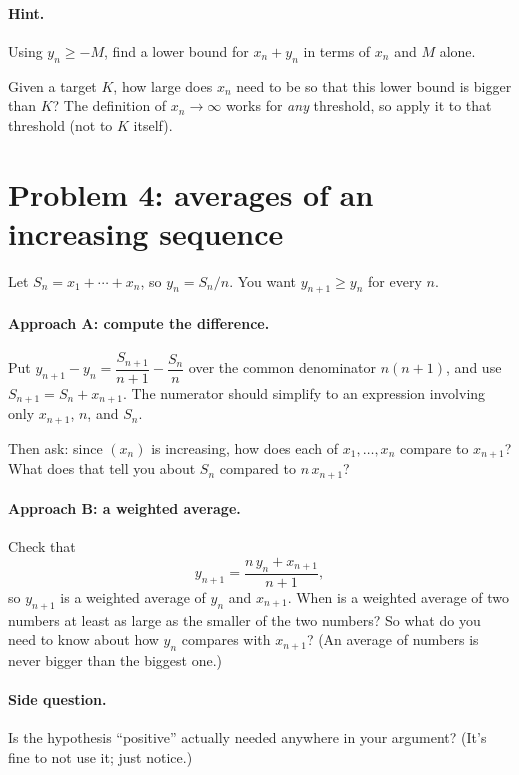 \documentclass[11pt]{article}
\begin{document}
\paragraph{Hint.}
Using $y_n\ge -M$, find a lower bound for $x_n+y_n$ in terms of $x_n$ and
$M$ alone.

Given a target $K$, how large does $x_n$ need to be so that this lower
bound is bigger than $K$? The definition of $x_n\to\infty$ works for
\emph{any} threshold, so apply it to that threshold (not to $K$ itself).

\section*{Problem 4: averages of an increasing sequence}

Let $S_n=x_1+\cdots+x_n$, so $y_n=S_n/n$. You want $y_{n+1}\ge y_n$ for
every $n$.

\paragraph{Approach A: compute the difference.}
Put $y_{n+1}-y_n=\dfrac{S_{n+1}}{n+1}-\dfrac{S_n}{n}$ over the common
denominator $n(n+1)$, and use $S_{n+1}=S_n+x_{n+1}$. The numerator should
simplify to an expression involving only $x_{n+1}$, $n$, and $S_n$.

Then ask: since $(x_n)$ is increasing, how does each of
$x_1,\dots,x_n$ compare to $x_{n+1}$? What does that tell you about $S_n$
compared to $n\,x_{n+1}$?

\paragraph{Approach B: a weighted average.}
Check that
\[
  y_{n+1}=\frac{n\,y_n + x_{n+1}}{n+1},
\]
so $y_{n+1}$ is a weighted average of $y_n$ and $x_{n+1}$. When is a
weighted average of two numbers at least as large as the smaller of the
two numbers? So what do you need to know about how $y_n$ compares with
$x_{n+1}$? (An average of numbers is never bigger than the biggest one.)

\paragraph{Side question.} Is the hypothesis ``positive'' actually needed
anywhere in your argument? (It's fine to not use it; just notice.)
\end{document}
